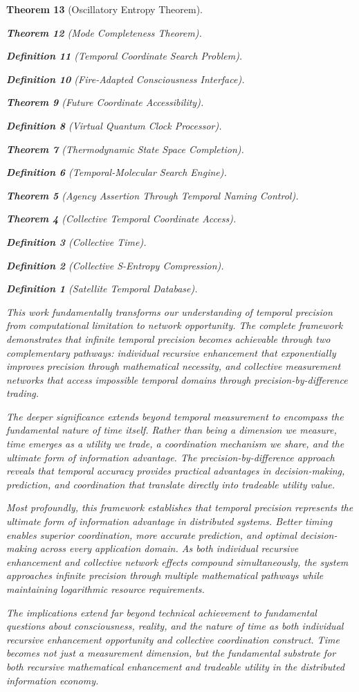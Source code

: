 \documentclass[12pt,a4paper]{article}
\newtheorem{theorem}{Theorem}[section]
\newtheorem{definition}[theorem]{Definition}
\begin{document}
\begin{theorem}[Oscillatory Entropy Theorem]
\begin{theorem}[Mode Completeness Theorem]
\begin{enumerate}
\begin{definition}[Temporal Coordinate Search Problem]
\begin{algorithm}
\begin{definition}[Fire-Adapted Consciousness Interface]
\begin{theorem}[Future Coordinate Accessibility]
\begin{definition}[Virtual Quantum Clock Processor]
\begin{itemize}
\begin{itemize}
\begin{theorem}[Thermodynamic State Space Completion]
\begin{definition}[Temporal-Molecular Search Engine]
\begin{theorem}[Agency Assertion Through Temporal Naming Control]
\begin{remark}
\begin{theorem}[Collective Temporal Coordinate Access]
\begin{definition}[Collective Time]
\begin{definition}[Collective S-Entropy Compression]
\begin{definition}[Satellite Temporal Database]
\begin{algorithm}
\begin{table}[h]
{{This work fundamentally transforms our understanding of temporal precision from computational limitation to network opportunity. The complete framework demonstrates that infinite temporal precision becomes achievable through two complementary pathways: individual recursive enhancement that exponentially improves precision through mathematical necessity, and collective measurement networks that access impossible temporal domains through precision-by-difference trading.

The deeper significance extends beyond temporal measurement to encompass the fundamental nature of time itself. Rather than being a dimension we measure, time emerges as a utility we trade, a coordination mechanism we share, and the ultimate form of information advantage. The precision-by-difference approach reveals that temporal accuracy provides practical advantages in decision-making, prediction, and coordination that translate directly into tradeable utility value.

Most profoundly, this framework establishes that temporal precision represents the ultimate form of information advantage in distributed systems. Better timing enables superior coordination, more accurate prediction, and optimal decision-making across every application domain. As both individual recursive enhancement and collective network effects compound simultaneously, the system approaches infinite precision through multiple mathematical pathways while maintaining logarithmic resource requirements.

The implications extend far beyond technical achievement to fundamental questions about consciousness, reality, and the nature of time as both individual recursive enhancement opportunity and collective coordination construct. Time becomes not just a measurement dimension, but the fundamental substrate for both recursive mathematical enhancement and tradeable utility in the distributed information economy.

}}
\end{table}
\end{algorithm}
\end{definition}
\end{definition}
\end{definition}
\end{theorem}
\end{remark}
\end{theorem}
\end{definition}
\end{theorem}
\end{itemize}
\end{itemize}
\end{definition}
\end{theorem}
\end{definition}
\end{algorithm}
\end{definition}
\end{enumerate}
\end{theorem}
\end{theorem}
\end{document}
